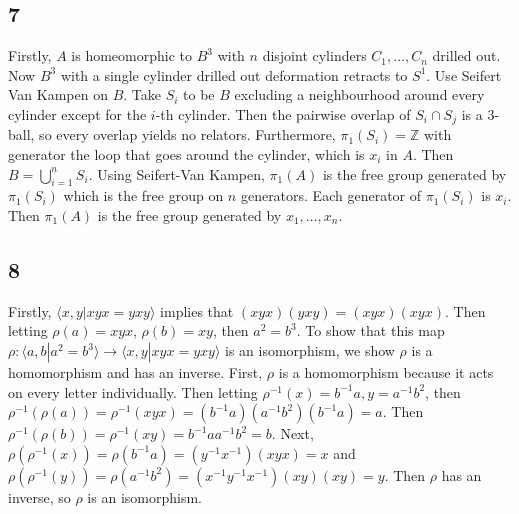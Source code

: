 \documentclass{article}
\theoremstyle{definition}
\numberwithin{theorem}{section}
\numberwithin{equation}{section}
\begin{document}
\subsection{7}
Firstly, $A$ is homeomorphic to $B^3$ with $n$ disjoint cylinders $C_1, \ldots , C_n$ drilled out. Now $B^3$ with a single cylinder drilled out deformation retracts to $S^1$. Use Seifert Van Kampen on $B$. Take $S_i$ to be $B$ excluding a neighbourhood around every cylinder except for the $i$-th cylinder. Then the pairwise overlap of $S_i \cap S_j$ is a $3$-ball, so every overlap yields no relators. Furthermore, $\pi_1(S_i) = \mathbb{Z}$ with generator the loop that goes around the cylinder, which is $x_i$ in $A$. Then $B = \bigcup_{i = 1}^n S_i$. Using Seifert-Van Kampen, $\pi_1(A)$ is the free group generated by $\pi_1(S_i)$ which is the free group on $n$ generators. Each generator of $\pi_1(S_i)$ is $x_i$. Then $\pi_1(A)$ is the free group generated by $x_1, ..., x_n$. 

\subsection{8}
Firstly, $\langle x, y | xyx = yxy \rangle$ implies that $(xyx)(yxy) = (xyx)(xyx)$. Then letting $\rho(a) = xyx$, $\rho(b) = xy$, then $a^2 = b^3$. To show that this map $\rho : \langle a, b | a^2 = b^3 \rangle \rightarrow \langle x, y | xyx = yxy \rangle$ is an isomorphism, we show $\rho$ is a homomorphism and has an inverse. First, $\rho$ is a homomorphism because it acts on every letter individually. Then letting $\rho^{-1}(x) = b^{-1} a, y = a^{-1} b^2$, then $\rho^{-1}(\rho(a)) = \rho^{-1}(xyx) = (b^{-1} a)(a^{-1} b^2)(b^{-1} a) =a$. Then $\rho^{-1}(\rho(b)) = \rho^{-1}(xy) = b^{-1} a a^{-1} b^2 = b$. Next, $\rho(\rho^{-1}(x)) = \rho(b^{-1} a) = (y^{-1} x^{-1}) (xyx) = x$ and $ \rho(\rho^{-1}(y)) = \rho(a^{-1} b^2 ) = (x^{-1} y^{-1} x^{-1})(xy)(xy) = y$. Then $\rho$ has an inverse, so $\rho$ is an isomorphism. 
\end{document}

